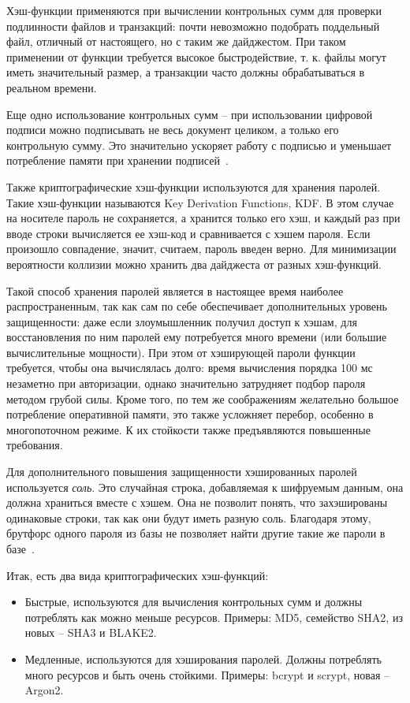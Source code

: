 Хэш-функции применяются при вычислении контрольных сумм для проверки подлинности файлов и транзакций: почти невозможно подобрать поддельный файл, отличный от настоящего, но с таким же дайджестом. При таком применении от функции требуется высокое быстродействие, т. к. файлы могут иметь значительный размер, а транзакции часто должны обрабатываться в реальном времени.

Еще одно использование контрольных сумм – при использовании цифровой подписи можно подписывать не весь документ целиком, а только его контрольную сумму. Это значительно ускоряет работу с подписью и уменьшает потребление памяти при хранении подписей~\cite{src15}.

Также криптографические хэш-функции используются для хранения паролей. Такие хэш-функции называются Key Derivation Functions, KDF. В этом случае на носителе пароль не сохраняется, а хранится только его хэш, и каждый раз при вводе строки вычисляется ее хэш-код и сравнивается с хэшем пароля. Если произошло совпадение, значит, считаем, пароль введен верно. Для минимизации вероятности коллизии можно хранить два дайджеста от разных хэш-функций.

Такой способ хранения паролей является в настоящее время наиболее распространенным, так как сам по себе обеспечивает дополнительных уровень защищенности: даже если злоумышленник получил доступ к хэшам, для восстановления по ним паролей ему потребуется много времени (или большие вычислительные мощности). При этом от хэширующей пароли функции требуется, чтобы она вычислялась долго: время вычисления порядка 100 мс незаметно при авторизации, однако значительно затрудняет подбор пароля методом грубой силы. Кроме того, по тем же соображениям желательно большое потребление оперативной памяти, это также усложняет перебор, особенно в многопоточном режиме. К их стойкости также предъявляются повышенные требования.

Для дополнительного повышения защищенности хэшированных паролей используется \textit{соль}. Это случайная строка, добавляемая к шифруемым данным, она должна храниться вместе с хэшем. Она не позволит понять, что захэшированы одинаковые строки, так как они будут иметь разную соль. Благодаря этому, брутфорс одного пароля из базы не позволяет найти другие такие же пароли в базе~\cite{src15}.

Итак, есть два вида криптографических хэш-функций:
\begin{itemize}
	\item Быстрые, используются для вычисления контрольных сумм и должны потреблять как можно меньше ресурсов. Примеры: MD5, семейство SHA2, из новых – SHA3 и BLAKE2.
	\item Медленные, используются для хэширования паролей. Должны потреблять много ресурсов и быть очень стойкими. Примеры: bcrypt и scrypt, новая – Argon2.
\end{itemize}


